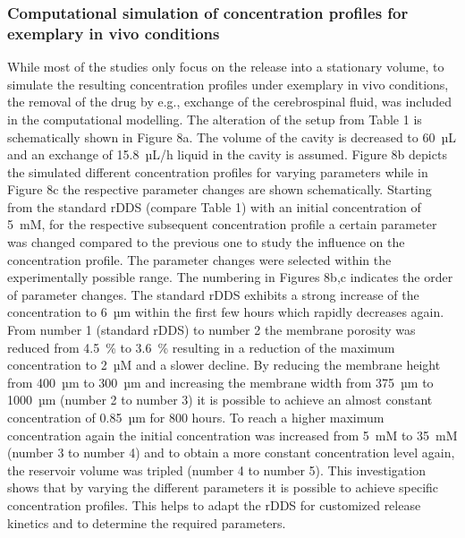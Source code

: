 \subsubsection{Computational simulation of concentration profiles for exemplary in vivo conditions}
While most of the studies only focus on the release into a stationary volume, to simulate the resulting concentration profiles under exemplary in vivo conditions, the removal of the drug by e.g., exchange of the cerebrospinal fluid, was included in the computational modelling. The alteration of the setup from Table 1 is schematically shown in Figure 8a. The volume of the cavity is decreased to 60~µL and an exchange of 15.8~µL/h liquid in the cavity is assumed. Figure 8b depicts the simulated different concentration profiles for varying parameters while in Figure 8c the respective parameter changes are shown schematically. Starting from the standard rDDS (compare Table 1) with an initial concentration of 5~mM, for the respective subsequent concentration profile a certain parameter was changed compared to the previous one to study the influence on the concentration profile. The parameter changes were selected within the experimentally possible range. The numbering in Figures 8b,c indicates the order of parameter changes. The standard rDDS exhibits a strong increase of the concentration to 6~µm within the first few hours which rapidly decreases again. From number 1 (standard rDDS) to number 2 the membrane porosity was reduced from 4.5~\% to 3.6~\% resulting in a reduction of the maximum concentration to 2~µM and a slower decline. By reducing the membrane height from 400~µm to 300~µm and increasing the membrane width from 375~µm to 1000~µm (number 2 to number 3) it is possible to achieve an almost constant concentration of 0.85~µm for 800 hours. To reach a higher maximum concentration again the initial concentration was increased from 5~mM to 35~mM (number 3 to number 4) and to obtain a more constant concentration level again, the reservoir volume was tripled (number 4 to number 5). This investigation shows that by varying the different parameters it is possible to achieve specific concentration profiles. This helps to adapt the rDDS for customized release kinetics and to determine the required parameters. 

